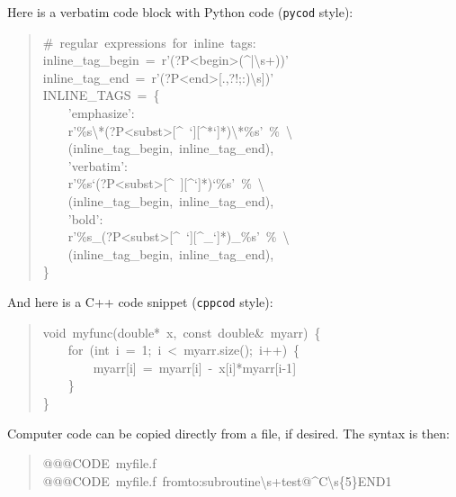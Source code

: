 \documentclass[a4paper]{article}
\begin{document}
Here is a verbatim code block with Python code (\texttt{pycod} style):
%
\begin{quote}{\ttfamily \raggedright \noindent
\#~regular~expressions~for~inline~tags:\\
inline\_tag\_begin~=~r'(?P<begin>(\textasciicircum{}|\textbackslash{}s+))'\\
inline\_tag\_end~=~r'(?P<end>{[}.,?!;:)\textbackslash{}s{]})'\\
INLINE\_TAGS~=~\{\\
~~~~'emphasize':\\
~~~~r'\%s\textbackslash{}*(?P<subst>{[}\textasciicircum{}~`{]}{[}\textasciicircum{}*`{]}*)\textbackslash{}*\%s'~\%~\textbackslash{}\\
~~~~(inline\_tag\_begin,~inline\_tag\_end),\\
~~~~'verbatim':\\
~~~~r'\%s`(?P<subst>{[}\textasciicircum{}~{]}{[}\textasciicircum{}`{]}*)`\%s'~\%~\textbackslash{}\\
~~~~(inline\_tag\_begin,~inline\_tag\_end),\\
~~~~'bold':\\
~~~~r'\%s\_(?P<subst>{[}\textasciicircum{}~`{]}{[}\textasciicircum{}\_`{]}*)\_\%s'~\%~\textbackslash{}\\
~~~~(inline\_tag\_begin,~inline\_tag\_end),\\
\}
}
\end{quote}

And here is a C++ code snippet (\texttt{cppcod} style):
%
\begin{quote}{\ttfamily \raggedright \noindent
void~myfunc(double*~x,~const~double\&~myarr)~\{\\
~~~~for~(int~i~=~1;~i~<~myarr.size();~i++)~\{\\
~~~~~~~~myarr{[}i{]}~=~myarr{[}i{]}~-~x{[}i{]}*myarr{[}i-1{]}\\
~~~~\}\\
\}
}
\end{quote}

Computer code can be copied directly from a file, if desired. The syntax
is then:
%
\begin{quote}{\ttfamily \raggedright \noindent
@@@CODE~myfile.f\\
@@@CODE~myfile.f~fromto:subroutine\textbackslash{}s+test@\textasciicircum{}C\textbackslash{}s\{5\}END1
}
\end{quote}
\end{document}
